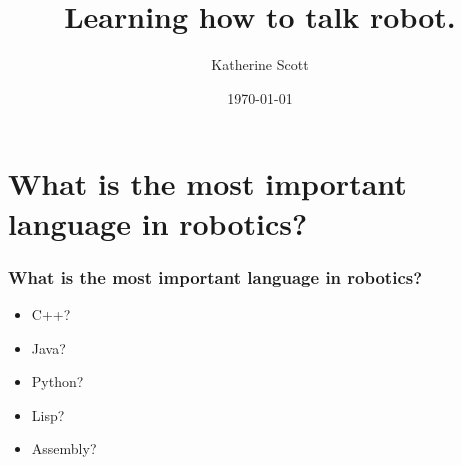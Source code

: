 \documentclass[compress]{beamer}
\title[RobotWords]{Learning how to talk robot.} %
\author{Katherine Scott} %
\institute[Computer Vision Engineer] %
{
Computer Vision Engineer
\medskip
\textit{katherine.a.scott@gmail.com}
\textit{http://www.kscottz.com}
}
\date{\today} %
\begin{document}
\begin{frame}
\titlepage %
\end{frame}



\section{What is the most important language in robotics?}
\begin{frame}
  \frametitle{What is the most important language in robotics?}
  \begin{itemize}
  \item C++?
  \item Java?
  \item Python?
  \item Lisp?
  \item Assembly?
  \end{itemize}
\end{frame}
\end{document}
